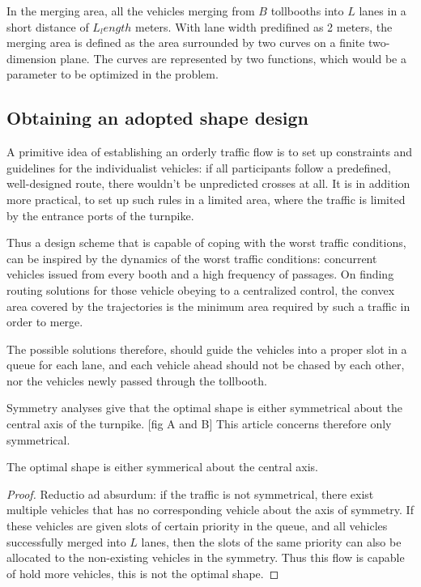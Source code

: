 \documentclass{mcmthesis}
\begin{document}
In the merging area, all the vehicles merging from $B$ tollbooths into $L$ lanes in a short distance of $L_length$ meters.
With lane width predifined as 2 meters, the merging area is defined as the area surrounded by two curves on a finite two-dimension plane. The curves are represented by two functions, which would be a parameter to be optimized in the problem.

\subsection{Obtaining an adopted shape design}

A primitive idea of establishing an orderly traffic flow is to set up constraints and guidelines for the individualist vehicles: if all participants follow a predefined, well-designed route, there wouldn't be unpredicted crosses at all. It is in addition more practical, to set up such rules in a limited area, where the traffic is limited by the entrance ports of the turnpike.

Thus a design scheme that is capable of coping with the worst traffic conditions, can be inspired by the dynamics of the worst traffic conditions: concurrent vehicles issued from every booth and a high frequency of passages. On finding routing solutions for those vehicle obeying to a centralized control, the convex area covered by the trajectories is the minimum area required by such a traffic in order to merge.

The possible solutions therefore, should guide the vehicles into a proper slot in a queue for each lane, and each vehicle ahead should not be chased by each other, nor the vehicles newly passed through the tollbooth.

Symmetry analyses give that the optimal shape is either symmetrical about the central axis of the turnpike. [fig A and B] This article concerns therefore only symmetrical.

\begin{Theorem} \label{thm:latex}
The optimal shape is either symmerical about the central axis.
\end{Theorem}

\begin{proof}
Reductio ad absurdum: if the traffic is not symmetrical, there exist multiple vehicles that has no corresponding vehicle about the axis of symmetry. If these vehicles are given slots of certain priority in the queue, and all vehicles successfully merged into $L$ lanes, then the slots of the same priority can also be allocated to the non-existing vehicles in the symmetry. Thus this flow is capable of hold more vehicles, this is not the optimal shape.
\end{proof}
\end{document}
